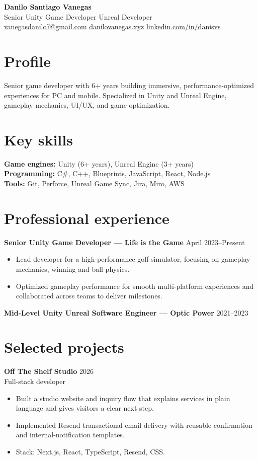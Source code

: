 \documentclass[10pt,letterpaper]{article}
\begin{document}
\begin{center}
  {\LARGE\textbf{Danilo Santiago Vanegas}}\\[4pt]
  Senior Unity Game Developer \textbar{} Unreal Developer\\
  \href{mailto:vanegasdanilo7@gmail.com}{vanegasdanilo7@gmail.com} \textbar{} \href{https://danilovanegas.xyz}{danilovanegas.xyz} \textbar{} \href{https://linkedin.com/in/danisvs}{linkedin.com/in/danisvs}
\end{center}

\section*{Profile}
Senior game developer with 6+ years building immersive, performance-optimized experiences for PC and mobile. Specialized in Unity and Unreal Engine, gameplay mechanics, UI/UX, and game optimization.

\section*{Key skills}
\textbf{Game engines:} Unity (6+ years), Unreal Engine (3+ years)\\
\textbf{Programming:} C\#, C++, Blueprints, JavaScript, React, Node.js\\
\textbf{Tools:} Git, Perforce, Unreal Game Sync, Jira, Miro, AWS

\section*{Professional experience}
\textbf{Senior Unity Game Developer --- Life is the Game} \hfill April 2023--Present\\[-5pt]
\begin{itemize}
  \item Lead developer for a high-performance golf simulator, focusing on gameplay mechanics, winning and ball physics.
  \item Optimized gameplay performance for smooth multi-platform experiences and collaborated across teams to deliver milestones.
\end{itemize}

\textbf{Mid-Level Unity \textbar{} Unreal Software Engineer --- Optic Power} \hfill 2021--2023

\section*{Selected projects}
\textbf{Off The Shelf Studio} \hfill 2026\\
Full-stack developer\\[-5pt]
\begin{itemize}
  \item Built a studio website and inquiry flow that explains services in plain language and gives visitors a clear next step.
  \item Implemented Resend transactional email delivery with reusable confirmation and internal-notification templates.
  \item Stack: Next.js, React, TypeScript, Resend, CSS.
\end{itemize}
\end{document}
